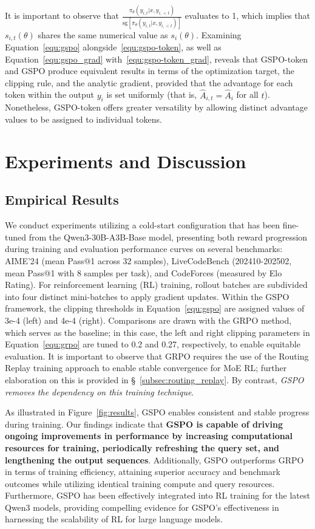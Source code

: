 It is important to observe that $\frac{ \pi_{\theta} (y_{i,t} | x, y_{i,<t}) }{ \mathrm{sg} \left[ \pi_{\theta} (y_{i,t} | x, y_{i,<t}) \right] }$ evaluates to 1, which implies that $s_{i,t}(\theta)$ shares the same numerical value as $s_{i}(\theta)$. Examining Equation~\eqref{equ:gspo} alongside~\eqref{equ:gspo-token}, as well as Equation~\eqref{equ:gspo_grad} with~\eqref{equ:gspo-token_grad}, reveals that GSPO-token and GSPO produce equivalent results in terms of the optimization target, the clipping rule, and the analytic gradient, provided that the advantage for each token within the output $y_i$ is set uniformly (that is, $\widehat{A}_{i,t} = \widehat{A}_{i}$ for all $t$). Nonetheless, GSPO-token offers greater versatility by allowing distinct advantage values to be assigned to individual tokens.

\section{Experiments and Discussion}

\subsection{Empirical Results}

We conduct experiments utilizing a cold-start configuration that has been fine-tuned from the Qwen3-30B-A3B-Base model, presenting both reward progression during training and evaluation performance curves on several benchmarks: AIME'24 (mean Pass@1 across 32 samples), LiveCodeBench (202410-202502, mean Pass@1 with 8 samples per task), and CodeForces (measured by Elo Rating). For reinforcement learning (RL) training, rollout batches are subdivided into four distinct mini-batches to apply gradient updates. Within the GSPO framework, the clipping thresholds in Equation~\eqref{equ:gspo} are assigned values of 3e-4 (left) and 4e-4 (right). Comparisons are drawn with the GRPO method, which serves as the baseline; in this case, the left and right clipping parameters in Equation~\eqref{equ:grpo} are tuned to 0.2 and 0.27, respectively, to enable equitable evaluation. It is important to observe that GRPO requires the use of the Routing Replay training approach to enable stable convergence for MoE RL; further elaboration on this is provided in \S~\ref{subsec:routing_replay}. By contrast, \textit{GSPO removes the dependency on this training technique}.

As illustrated in Figure~\ref{fig:results}, GSPO enables consistent and stable progress during training. Our findings indicate that \textbf{GSPO is capable of driving ongoing improvements in performance by increasing computational resources for training, periodically refreshing the query set, and lengthening the output sequences}. Additionally, GSPO outperforms GRPO in terms of training efficiency, attaining superior accuracy and benchmark outcomes while utilizing identical training compute and query resources. Furthermore, GSPO has been effectively integrated into RL training for the latest Qwen3 models, providing compelling evidence for GSPO's effectiveness in harnessing the scalability of RL for large language models.


